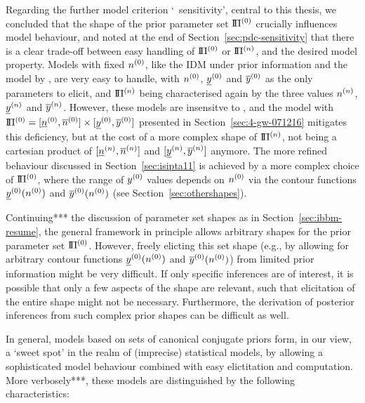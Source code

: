 Regarding the further model criterion `\pdc\ sensitivity',
central to this thesis,
we concluded that the shape of the prior parameter set $\text{I}\!\Pi^{(0)}$
crucially influences model behaviour, 
and noted at the end of Section~\ref{sec:pdc-sensitivity} that
there is a clear trade-off between easy handling of $\text{I}\!\Pi^{(0)}$ or $\text{I}\!\Pi^{(n)}$, and the desired model property.
Models with fixed $n^{(0)}$, like the IDM under prior information and the model by \textcite{2005:quaeghebeurcooman},
are very easy to handle, with $n^{(0)}$, $\underline{y}^{(0)}$ and $\overline{y}^{(0)}$ as the only parameters to elicit,
and $\text{I}\!\Pi^{(n)}$ being characterised again by the three values $n^{(n)}$, $\underline{y}^{(n)}$ and $\overline{y}^{(n)}$.
However, these models are insensitve to \pdc,
and the model with $\text{I}\!\Pi^{(0)} = [\underline{n}^{(0)}, \overline{n}^{(0)}] \times [\underline{y}^{(0)}, \overline{y}^{(0)}]$
presented in Section~\ref{sec:4-gw-071216}
mitigates this deficiency, but at the cost of a more complex shape of $\text{I}\!\Pi^{(n)}$,
not being a cartesian product of $[\underline{n}^{(n)}, \overline{n}^{(n)}]$ and $[\underline{y}^{(n)}, \overline{y}^{(n)}]$ anymore.
The more refined behaviour discussed in Section~\ref{sec:isipta11}
is achieved by a more complex choice of $\text{I}\!\Pi^{(0)}$,
where the range of $y^{(0)}$ values depends on $n^{(0)}$
via the contour functions $\underline{y}^{(0)}(n^{(0)})$ and $\overline{y}^{(0)}(n^{(0)})$
(see Section~\ref{sec:othershapes}).

Continuing*** the discussion of parameter set shapes as in Section~\ref{sec:ibbm-resume},
the general framework in principle allows arbitrary shapes for the prior parameter set $\text{I}\!\Pi^{(0)}$.
However, freely elicting this set shape
(e.g., by allowing for arbitrary contour functions $\underline{y}^{(0)}(n^{(0)})$ and $\overline{y}^{(0)}(n^{(0)})$)
from limited prior information might be very difficult.
If only specific inferences are of interest,
it is possible that only a few aspects of the shape are relevant,
such that elicitation of the entire shape might not be necessary.
Furthermore, the derivation of posterior inferences from
such complex prior shapes can be difficult as well.

In general, %
models based on sets of canonical conjugate priors form, in our view,
a `sweet spot' in the realm of (imprecise) statistical models,
by allowing a sophisticated model behaviour
combined with easy elictitation and computation.
More verbosely***,
these models are distinguished by the following characteristics:

